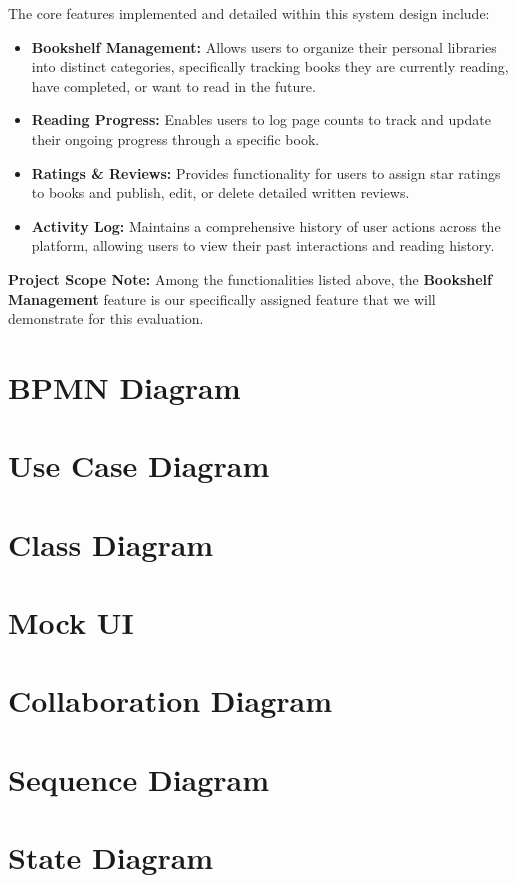 \documentclass[12pt, a4paper]{report}
\begin{document}
\vspace{0.5cm}

The core features implemented and detailed within this system design include:

\begin{itemize}
    \item \textbf{Bookshelf Management:} Allows users to organize their personal libraries into distinct categories, specifically tracking books they are currently reading, have completed, or want to read in the future.
    \item \textbf{Reading Progress:} Enables users to log page counts to track and update their ongoing progress through a specific book.
    \item \textbf{Ratings \& Reviews:} Provides functionality for users to assign star ratings to books and publish, edit, or delete detailed written reviews.
    \item \textbf{Activity Log:} Maintains a comprehensive history of user actions across the platform, allowing users to view their past interactions and reading history.
\end{itemize}

\vspace{0.5cm}
\noindent \textbf{Project Scope Note:} Among the functionalities listed above, the \textbf{Bookshelf Management} feature is our specifically assigned feature that we will demonstrate for this evaluation.
\chapter{BPMN Diagram}
\chapter{Use Case Diagram}
\chapter{Class Diagram}
\chapter{Mock UI}
\chapter{Collaboration Diagram}
\chapter{Sequence Diagram}
\chapter{State Diagram}
\end{document}
